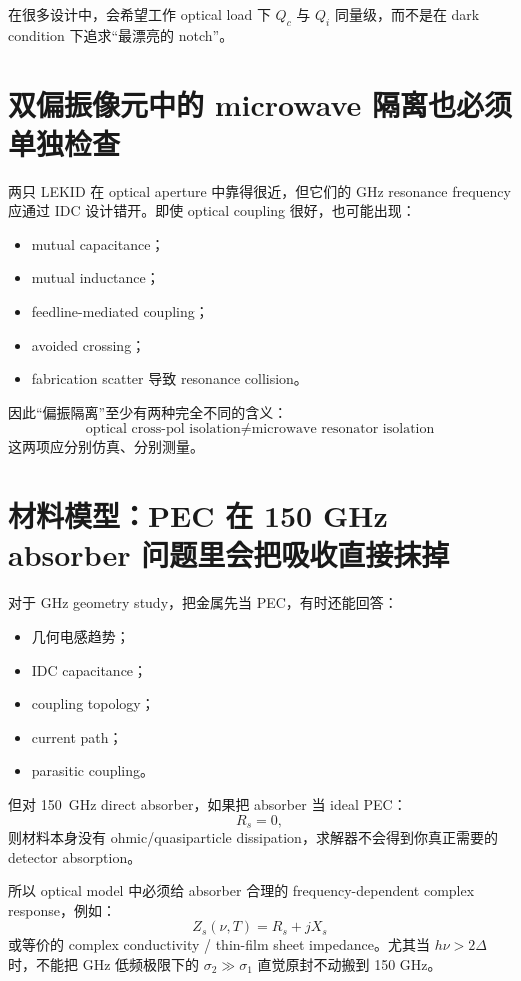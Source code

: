 \documentclass[11pt,a4paper,openany]{ctexrep}
\begin{document}
在很多设计中，会希望工作 optical load 下 $Q_c$ 与 $Q_i$ 同量级，而不是在 dark condition 下追求“最漂亮的 notch”。

\section{双偏振像元中的 microwave 隔离也必须单独检查}

两只 LEKID 在 optical aperture 中靠得很近，但它们的 GHz resonance frequency 应通过 IDC 设计错开。即使 optical coupling 很好，也可能出现：
\begin{itemize}
  \item mutual capacitance；
  \item mutual inductance；
  \item feedline-mediated coupling；
  \item avoided crossing；
  \item fabrication scatter 导致 resonance collision。
\end{itemize}

因此“偏振隔离”至少有两种完全不同的含义：
\[
\boxed{
\text{optical cross-pol isolation}
\neq
\text{microwave resonator isolation}
}
\]
这两项应分别仿真、分别测量。

\section{材料模型：PEC 在 150 GHz absorber 问题里会把吸收直接抹掉}

对于 GHz geometry study，把金属先当 PEC，有时还能回答：
\begin{itemize}
  \item 几何电感趋势；
  \item IDC capacitance；
  \item coupling topology；
  \item current path；
  \item parasitic coupling。
\end{itemize}

但对 \SI{150}{GHz} direct absorber，如果把 absorber 当 ideal PEC：
\[
R_s=0,
\]
则材料本身没有 ohmic/quasiparticle dissipation，求解器不会得到你真正需要的 detector absorption。

所以 optical model 中必须给 absorber 合理的 frequency-dependent complex response，例如：
\[
Z_s(\nu,T)=R_s+jX_s
\]
或等价的 complex conductivity / thin-film sheet impedance。尤其当 $h\nu>2\Delta$ 时，不能把 GHz 低频极限下的 $\sigma_2\gg\sigma_1$ 直觉原封不动搬到 150 GHz。
\end{document}
